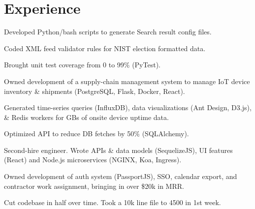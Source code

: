 \documentclass[]{deedy-resume-openfont}
\begin{document}
\hfill
\begin{minipage}[t]{0.66\textwidth}


\section{Experience}
\sectionsep

\vspace{\topsep}
\begin{tightemize}

\item Developed Python/bash scripts to generate Search result config files.
\item Coded XML feed validator rules for NIST election formatted data.
\item Brought unit test coverage from 0 to 99\% (PyTest).

\end{tightemize}
\sectionsep

\begin{tightemize}

\item Owned development of a supply-chain management system to manage IoT device inventory \& shipments (PostgreSQL, Flask, Docker, React).
\item Generated time-series queries (InfluxDB), data visualizations (Ant Design, D3.js), \& Redis workers for GBs of onsite device uptime data.
\item Optimized API to reduce DB fetches by 50\% (SQLAlchemy).

\end{tightemize}
\sectionsep


\begin{tightemize}

\item Second-hire engineer. Wrote APIs \& data models (SequelizeJS), UI features (React) and Node.js microservices (NGINX, Koa, Ingress).
\item Owned development of auth system (PassportJS), SSO, calendar export, and contractor work assignment, bringing in over \$20k in MRR.
\item Cut codebase in half over time. Took a 10k line file to 4500 in 1st week.


\end{tightemize}
\end{minipage}
\end{document}
